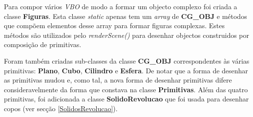 \documentclass[a5paper,onecolumn, 11pt]{article}
\begin{document}
Para compor vários \textit{VBO} de modo a formar um objecto complexo foi criada a classe \textbf{Figuras}. Esta classe \textit{static} apenas tem um \textit{array} de \textbf{CG\_OBJ} e métodos que compõem elementos desse array para formar figuras complexas. Estes métodos são utilizados pelo \textit{renderScene()} para desenhar objectos construidos por composição de primitivas.

Foram também criadas sub-classes da classe \textbf{CG\_OBJ} correspondentes às várias primitivas: \textbf{Plano}, \textbf{Cubo}, \textbf{Cilindro} e \textbf{Esfera}. De notar que a forma de desenhar as primitivas mudou e, como tal, a nova forma de desenhar primitivas difere consideravelmente da forma que constava na classe \textbf{Primitivas}. Além das quatro primitivas, foi adicionada a classe \textbf{SolidoRevolucao} que foi usada para desenhar copos (ver secção \ref{SolidosRevolucao}).
\end{document}
